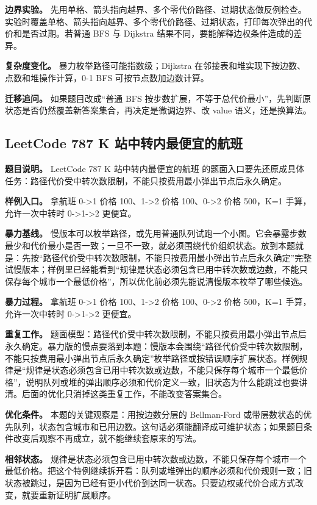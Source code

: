 \textbf{边界实验。} 先用单格、箭头指向越界、多个零代价路径、过期状态做反例检查。实验时覆盖单格、箭头指向越界、多个零代价路径、过期状态，打印每次弹出的代价和是否过期。若普通 BFS 与 Dijkstra 结果不同，要能解释边权条件造成的差异。

\textbf{复杂度变化。} 暴力枚举路径可能指数级；Dijkstra 在邻接表和堆实现下按边数、点数和堆操作计算，0-1 BFS 可按节点数加边数计算。

\textbf{迁移追问。} 如果题目改成“普通 BFS 按步数扩展，不等于总代价最小”，先判断原状态是否仍然覆盖新答案集合，再决定是微调边界、改 value 语义，还是换算法。

\subsection{LeetCode 787 K 站中转内最便宜的航班}

\textbf{题目说明。} LeetCode 787 K 站中转内最便宜的航班 的题面入口要先还原成具体任务：路径代价受中转次数限制，不能只按费用最小弹出节点后永久确定。

\textbf{样例入口。} 拿航班 0->1 价格 100、1->2 价格 100、0->2 价格 500，K=1 手算，允许一次中转时 0->1->2 更便宜。

\textbf{暴力基线。} 慢版本可以枚举路径，或先用普通队列试跑一个小图。它会暴露步数最少和代价最小是否一致；一旦不一致，就必须围绕代价组织状态。放到本题就是：先按“路径代价受中转次数限制，不能只按费用最小弹出节点后永久确定”完整试慢版本；样例里已经能看到“规律是状态必须包含已用中转次数或边数，不能只保存每个城市一个最低价格”，所以优化前必须先能说清慢版本枚举了哪些候选。

\textbf{暴力过程。} 拿航班 0->1 价格 100、1->2 价格 100、0->2 价格 500，K=1 手算，允许一次中转时 0->1->2 更便宜。

\textbf{重复工作。} 题面模型：路径代价受中转次数限制，不能只按费用最小弹出节点后永久确定。暴力版的慢点要落到本题：慢版本会围绕“路径代价受中转次数限制，不能只按费用最小弹出节点后永久确定”枚举路径或按错误顺序扩展状态。样例规律是“规律是状态必须包含已用中转次数或边数，不能只保存每个城市一个最低价格”，说明队列或堆的弹出顺序必须和代价定义一致，旧状态为什么能跳过也要讲清。后面的优化只消掉这类重复工作，不能改变答案集合。

\textbf{优化条件。} 本题的关键观察是：用按边数分层的 Bellman-Ford 或带层数状态的优先队列，状态包含城市和已用边数。这句话必须能翻译成可维护状态；如果题目条件改变后观察不再成立，就不能继续套原来的写法。

\textbf{相邻状态。} 规律是状态必须包含已用中转次数或边数，不能只保存每个城市一个最低价格。把这个特例继续拆开看：队列或堆弹出的顺序必须和代价规则一致；旧状态被跳过，是因为已经有更小代价到达同一状态。只要边权或代价合成方式改变，就要重新证明扩展顺序。

